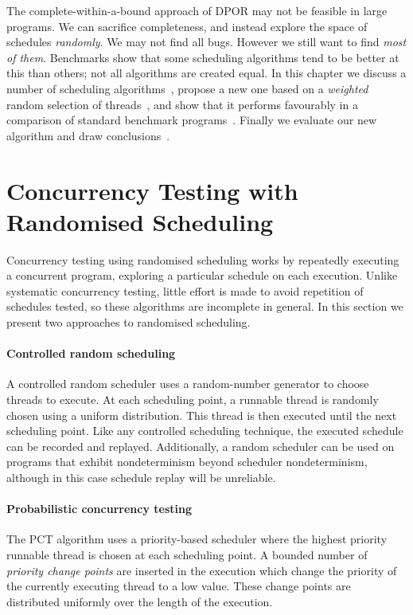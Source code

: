 The complete-within-a-bound approach of DPOR may not be feasible in
large programs.  We can sacrifice completeness, and instead explore
the space of schedules \emph{randomly}.  We may not find all bugs.
However we still want to find \emph{most of them}.  Benchmarks show
that some scheduling algorithms tend to be better at this than others;
not all algorithms are created equal.  In this chapter we discuss a
number of scheduling algorithms~, propose a new
one based on a \emph{weighted} random selection of
threads~, and show that it performs favourably
in a comparison of standard benchmark programs~.
Finally we evaluate our new algorithm and draw
conclusions~.

\section{Concurrency Testing with Randomised Scheduling}
\label{sec:algorithms-usual}

Concurrency testing using randomised scheduling works by repeatedly executing a
concurrent program, exploring a particular schedule on each execution.  Unlike
systematic concurrency testing, little effort is made to avoid repetition of
schedules tested, so these algorithms are incomplete in general.  In this
section we present two approaches to randomised scheduling.

\paragraph{Controlled random scheduling}
A controlled random scheduler uses a random-number generator to choose threads
to execute.  At each scheduling point, a runnable thread is randomly chosen
using a uniform distribution.  This thread is then executed until the next
scheduling point.  Like any controlled scheduling technique, the executed
schedule can be recorded and replayed.  Additionally, a random scheduler can be
used on programs that exhibit nondeterminism beyond scheduler nondeterminism,
although in this case schedule replay will be unreliable\cite{thomson2016}.

\paragraph{Probabilistic concurrency testing}
The PCT algorithm\cite{burckhardt2010} uses a priority-based scheduler where the
highest priority runnable thread is chosen at each scheduling point.  A bounded
number of \emph{priority change points} are inserted in the execution which
change the priority of the currently executing thread to a low value.  These
change points are distributed uniformly over the length of the execution.

